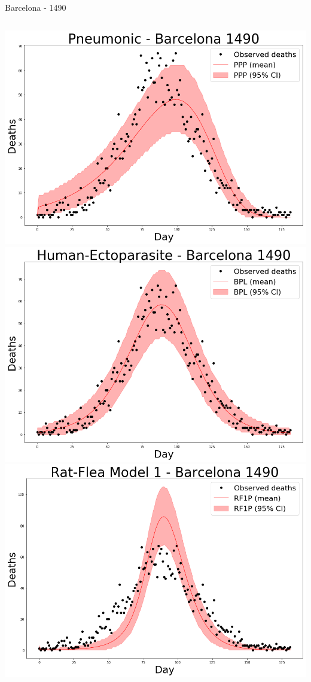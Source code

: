 \documentclass[t,10pt,fleqn]{beamer}
\begin{document}
\begin{frame}{Barcelona - 1490}
	\vspace{-.2cm}
	\begin{columns}
		\centering
		\includegraphics[width=\linewidth]{pneum/barcelona-40-30-22-15x10}
		\includegraphics[width=\linewidth]{h_ecto/barcelona-40-30-22-15x10}
		\centering
		\includegraphics[width=\linewidth]{rats1/barcelona-40-30-22-15x10}

\end{columns}
\end{frame}
\end{document}
